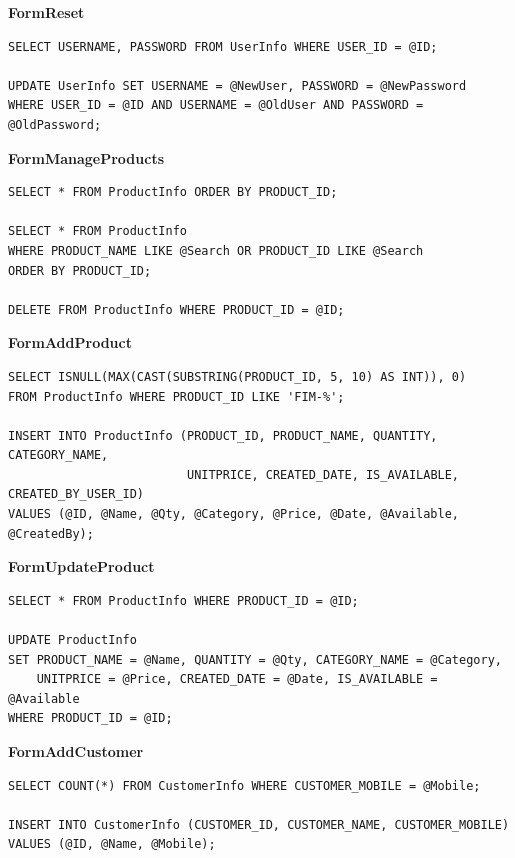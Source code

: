 \documentclass[12pt,a4paper]{article}
\begin{document}
\textbf{FormReset}
\begin{lstlisting}
SELECT USERNAME, PASSWORD FROM UserInfo WHERE USER_ID = @ID;

UPDATE UserInfo SET USERNAME = @NewUser, PASSWORD = @NewPassword
WHERE USER_ID = @ID AND USERNAME = @OldUser AND PASSWORD = @OldPassword;
\end{lstlisting}

\textbf{FormManageProducts}
\begin{lstlisting}
SELECT * FROM ProductInfo ORDER BY PRODUCT_ID;

SELECT * FROM ProductInfo
WHERE PRODUCT_NAME LIKE @Search OR PRODUCT_ID LIKE @Search
ORDER BY PRODUCT_ID;

DELETE FROM ProductInfo WHERE PRODUCT_ID = @ID;
\end{lstlisting}

\textbf{FormAddProduct}
\begin{lstlisting}
SELECT ISNULL(MAX(CAST(SUBSTRING(PRODUCT_ID, 5, 10) AS INT)), 0)
FROM ProductInfo WHERE PRODUCT_ID LIKE 'FIM-%';

INSERT INTO ProductInfo (PRODUCT_ID, PRODUCT_NAME, QUANTITY, CATEGORY_NAME,
                         UNITPRICE, CREATED_DATE, IS_AVAILABLE, CREATED_BY_USER_ID)
VALUES (@ID, @Name, @Qty, @Category, @Price, @Date, @Available, @CreatedBy);
\end{lstlisting}

\textbf{FormUpdateProduct}
\begin{lstlisting}
SELECT * FROM ProductInfo WHERE PRODUCT_ID = @ID;

UPDATE ProductInfo
SET PRODUCT_NAME = @Name, QUANTITY = @Qty, CATEGORY_NAME = @Category,
    UNITPRICE = @Price, CREATED_DATE = @Date, IS_AVAILABLE = @Available
WHERE PRODUCT_ID = @ID;
\end{lstlisting}

\textbf{FormAddCustomer}
\begin{lstlisting}
SELECT COUNT(*) FROM CustomerInfo WHERE CUSTOMER_MOBILE = @Mobile;

INSERT INTO CustomerInfo (CUSTOMER_ID, CUSTOMER_NAME, CUSTOMER_MOBILE)
VALUES (@ID, @Name, @Mobile);
\end{lstlisting}
\end{document}
